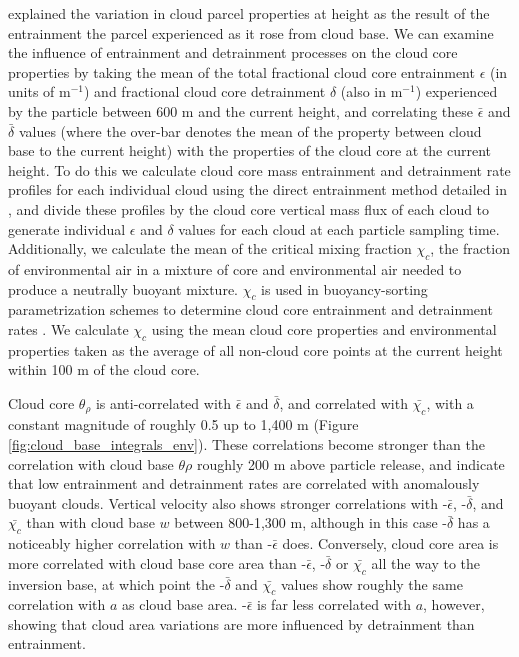 \documentclass[acp]{copernicus}
\begin{document}
\cite{Romps2010} explained the variation in cloud parcel properties at height 
as the result of the entrainment the parcel experienced as it rose from 
cloud base.  We can examine the influence of entrainment and detrainment 
processes on the cloud core properties by taking the mean of the total 
fractional cloud core entrainment $\epsilon$ (in units of m$^{-1}$) and 
fractional cloud core detrainment $\delta$ (also in m$^{-1}$) experienced by 
the particle between 600 m and the current height, and correlating these
$\bar{\epsilon}$ and $\bar{\delta}$ values (where the over-bar denotes the 
mean of the property between cloud base to the current height) with the 
properties of the cloud core at the current height.  To do this we calculate 
cloud core mass entrainment and detrainment rate profiles for each individual 
cloud using the direct entrainment method detailed in \cite{Dawe2011}, and 
divide these profiles by the cloud core vertical mass flux of each cloud to 
generate individual $\epsilon$ and $\delta$ values for each cloud at each 
particle sampling time.  Additionally, we calculate the mean of the critical 
mixing fraction $\chi_c$, the fraction of environmental air in a mixture of 
core and environmental air needed to produce a neutrally buoyant mixture.  
$\chi_c$ is used in buoyancy-sorting parametrization schemes to determine 
cloud core entrainment and detrainment rates \citep{Kain1990, Rooy2008}.  We 
calculate $\chi_c$ using the mean cloud core properties and environmental 
properties taken as the average of all non-cloud core points at the current 
height within 100 m of the cloud core.

Cloud core $\theta_\rho$ is anti-correlated with $\bar{\epsilon}$ and 
$\bar{\delta}$, and correlated with $\bar{\chi_c}$, with a constant 
magnitude of roughly 0.5 up to 1,400 m (Figure 
\ref{fig:cloud_base_integrals_env}). These correlations become stronger than 
the correlation with cloud base $\theta\rho$ roughly 200 m above particle 
release, and indicate that low entrainment and detrainment rates are correlated 
with anomalously buoyant clouds.  Vertical velocity also shows stronger 
correlations with -$\bar{\epsilon}$, -$\bar{\delta}$, and $\bar{\chi_c}$ 
than with cloud base $w$ between 800-1,300 m, although in this case 
-$\bar{\delta}$ has a noticeably higher correlation with $w$ than 
-$\bar{\epsilon}$ does.  Conversely, cloud core area is more correlated with 
cloud base core area than -$\bar{\epsilon}$, -$\bar{\delta}$ or 
$\bar{\chi_c}$ all the way to the inversion base, at which point the 
-$\bar{\delta}$ and $\bar{\chi_c}$ values show roughly the same correlation 
with $a$ as cloud base area.  -$\bar{\epsilon}$ is far less 
correlated with $a$, however, showing that cloud area variations are more 
influenced by detrainment than entrainment.
\end{document}
